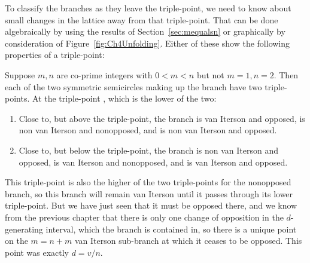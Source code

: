 %
\clearpage
{}%
%
To classify the branches as they leave the triple-point, we need to know about small changes in the lattice away from that triple-point. That can be done algebraically by using the results of Section~\ref{sec:mequalsn} or graphically by consideration of Figure~\ref{fig:Ch4Unfolding}. Either of these show the following properties of a triple-point:
\begin{theorem}
	Suppose $m,n$ are co-prime integers with $0<m<n$ but not $m=1,n=2$. Then each of the two symmetric semicircles making up the branch  have two triple-points. At the triple-point , which is the lower of the two:
	\begin{enumerate}
		\item Close to, but above the triple-point, the branch   is van Iterson and opposed,  is non van Iterson  and nonopposed, and  is non van Iterson and opposed. 
		\item Close to, but below the triple-point, the branch  is non van Iterson and opposed,  is van Iterson and nonopposed, and  is van Iterson and opposed.
	\end{enumerate}
	\label{thm:tp}
\end{theorem}
This triple-point is also the higher of the two triple-points for the nonopposed branch, so this branch will remain van Iterson until it passes through its lower triple-point. But we have just seen that it must be opposed there, 
and we know from the previous chapter that there is only one change of opposition in the $d$-generating interval, which the branch is contained in, so there is a unique point on the $m=n+m$ van Iterson sub-branch at which it ceases to be opposed. This point was exactly $d=v/n$. 
